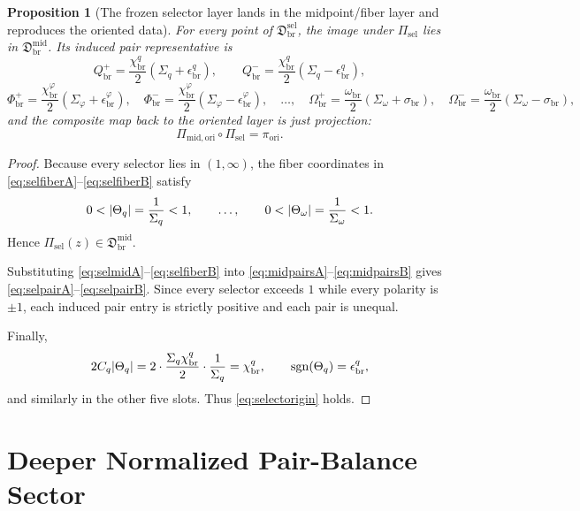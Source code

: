\documentclass[11pt]{article}
\newcommand{\AbsReadAmp}{\chi_{\mathrm{br}}^{q}}
\newcommand{\AbsCovAmp}{\chi_{\mathrm{br}}^{\varphi}}
\newcommand{\AbsScaleAmp}{\omega_{\mathrm{br}}}
\newcommand{\PolRead}{\epsilon_{\mathrm{br}}^{q}}
\newcommand{\PolCov}{\epsilon_{\mathrm{br}}^{\varphi}}
\newcommand{\PolScale}{\sigma_{\mathrm{br}}}
\newcommand{\PairReadPlus}{Q_{\mathrm{br}}^{+}}
\newcommand{\PairReadMinus}{Q_{\mathrm{br}}^{-}}
\newcommand{\PairCovPlus}{\Phi_{\mathrm{br}}^{+}}
\newcommand{\PairCovMinus}{\Phi_{\mathrm{br}}^{-}}
\newcommand{\PairScalePlus}{\Omega_{\mathrm{br}}^{+}}
\newcommand{\PairScaleMinus}{\Omega_{\mathrm{br}}^{-}}
\newcommand{\MidFiberSector}{\mathfrak D_{\mathrm{br}}^{\mathrm{mid}}}
\newcommand{\MidOriginMap}{\Pi_{\mathrm{mid,ori}}}
\newcommand{\MidRead}{C_{q}}
\newcommand{\FiberRead}{\Theta_{q}}
\newcommand{\FiberScale}{\Theta_{\omega}}
\newcommand{\MidSelSector}{\mathfrak D_{\mathrm{br}}^{\mathrm{sel}}}
\newcommand{\MidSelMap}{\Pi_{\mathrm{sel}}}
\newcommand{\SelProj}{\pi_{\mathrm{ori}}}
\newcommand{\SelRead}{\Sigma_{q}}
\newcommand{\SelCov}{\Sigma_{\varphi}}
\newcommand{\SelScale}{\Sigma_{\omega}}
\newtheorem{proposition}{Proposition}
\begin{document}
\begin{proposition}[The frozen selector layer lands in the midpoint/fiber layer and reproduces the oriented data]
\label{prop:selectorlayer}
For every point of \(\MidSelSector\), the image under \(\MidSelMap\) lies in \(\MidFiberSector\). Its induced pair representative is
\begin{equation}
\PairReadPlus=\frac{\AbsReadAmp}{2}(\SelRead+\PolRead),
\qquad
\PairReadMinus=\frac{\AbsReadAmp}{2}(\SelRead-\PolRead),
\label{eq:selpairA}
\end{equation}
\begin{equation}
\PairCovPlus=\frac{\AbsCovAmp}{2}(\SelCov+\PolCov),
\quad
\PairCovMinus=\frac{\AbsCovAmp}{2}(\SelCov-\PolCov),
\quad
\ldots,
\quad
\PairScalePlus=\frac{\AbsScaleAmp}{2}(\SelScale+\PolScale),
\quad
\PairScaleMinus=\frac{\AbsScaleAmp}{2}(\SelScale-\PolScale),
\label{eq:selpairB}
\end{equation}
and the composite map back to the oriented layer is just projection:
\begin{equation}
\MidOriginMap\circ\MidSelMap=\SelProj.
\label{eq:selectorigin}
\end{equation}
\end{proposition}

\begin{proof}
Because every selector lies in \((1,\infty)\), the fiber coordinates in \eqref{eq:selfiberA}--\eqref{eq:selfiberB} satisfy
\[
0<\abs{\FiberRead}=\frac{1}{\SelRead}<1,
\qquad
\ldots,
\qquad
0<\abs{\FiberScale}=\frac{1}{\SelScale}<1.
\]
Hence \(\MidSelMap(z)\in\MidFiberSector\).

Substituting \eqref{eq:selmidA}--\eqref{eq:selfiberB} into \eqref{eq:midpairsA}--\eqref{eq:midpairsB} gives \eqref{eq:selpairA}--\eqref{eq:selpairB}. Since every selector exceeds \(1\) while every polarity is \(\pm1\), each induced pair entry is strictly positive and each pair is unequal.

Finally,
\[
2\MidRead\abs{\FiberRead}
=
2\cdot\frac{\SelRead\AbsReadAmp}{2}\cdot\frac{1}{\SelRead}
=
\AbsReadAmp,
\qquad
\operatorname{sgn}(\FiberRead)=\PolRead,
\]
and similarly in the other five slots. Thus \eqref{eq:selectorigin} holds.
\end{proof}

\section{Deeper Normalized Pair-Balance Sector}
\end{document}
